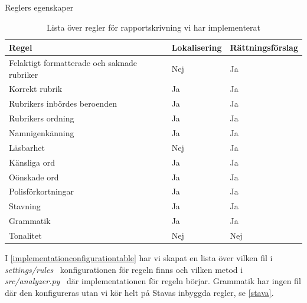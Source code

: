 \documentclass[swedish]{maucsthesis}
\begin{document}
\begin{table}[H]
\centering
\caption{Reglers egenskaper}
\begin{tabular}{|l|l|l|}
\hline
Regel                                       & Lokalisering & Rättningsförslag \\ \hline
Felaktigt formatterade och saknade rubriker & Nej          & Ja               \\ \hline
Korrekt rubrik                              & Ja           & Ja               \\ \hline
Rubrikers inbördes beroenden                & Ja          & Ja                \\ \hline
Rubrikers ordning                           & Ja           & Ja               \\ \hline
Namnigenkänning                             & Ja           & Ja               \\ \hline
Läsbarhet                                   & Nej          & Ja               \\ \hline
Känsliga ord                                & Ja           & Ja               \\ \hline
Oönskade ord                                & Ja           & Ja               \\ \hline
Polisförkortningar                          & Ja           & Ja               \\ \hline
Stavning                                    & Ja           & Ja               \\ \hline
Grammatik                                   & Ja           & Ja               \\ \hline
Tonalitet                                   & Nej          & Nej              \\ \hline
\end{tabular}
\caption*{Lista över regler för rapportskrivning vi har implementerat}
\label{rulestable}
\end{table}

I \cref{implementationconfigurationtable} har vi skapat en lista över vilken fil i \textit{settings/rules}~\cite{kalle:2019} konfigurationen för regeln finns och vilken metod
i \textit{src/analyzer.py}~\cite{kalle:2019} där implementationen för regeln börjar.
Grammatik har ingen fil där den konfigureras utan vi kör helt på Stavas inbyggda regler, se \cref{stava}.
\end{document}
